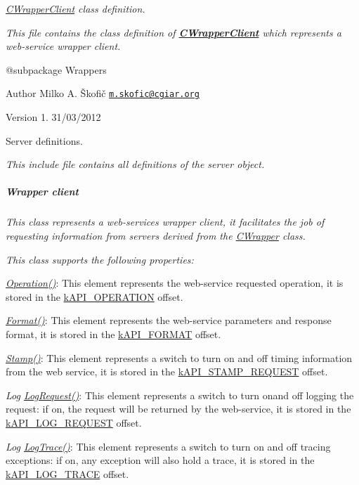 {\itshape {\itshape \hyperlink{class_c_wrapper_client}{C\-Wrapper\-Client}} class definition.}

{\itshape This file contains the class definition of {\bfseries \hyperlink{class_c_wrapper_client}{C\-Wrapper\-Client}} which represents a web-\/service wrapper client.}

{\itshape \begin{DoxyVerb} @subpackage        Wrappers
\end{DoxyVerb}
}

{\itshape \begin{DoxyAuthor}{Author}
Milko A. Škofič \href{mailto:m.skofic@cgiar.org}{\tt m.\-skofic@cgiar.\-org} 
\end{DoxyAuthor}
\begin{DoxyVersion}{Version}
1. 31/03/2012
\end{DoxyVersion}
Server definitions.}

{\itshape This include file contains all definitions of the server object. \subparagraph*{Wrapper client}}

{\itshape }

{\itshape This class represents a web-\/services wrapper client, it facilitates the job of requesting information from servers derived from the \hyperlink{class_c_wrapper}{C\-Wrapper} class.}

{\itshape This class supports the following properties\-:}

{\itshape 
\begin{DoxyItemize}
\item {\itshape \hyperlink{}{Operation()}}\-: This element represents the web-\/service requested operation, it is stored in the \hyperlink{}{k\-A\-P\-I\-\_\-\-O\-P\-E\-R\-A\-T\-I\-O\-N} offset. 
\item {\itshape \hyperlink{}{Format()}}\-: This element represents the web-\/service parameters and response format, it is stored in the \hyperlink{}{k\-A\-P\-I\-\_\-\-F\-O\-R\-M\-A\-T} offset. 
\item {\itshape \hyperlink{}{Stamp()}}\-: This element represents a switch to turn on and off timing information from the web service, it is stored in the \hyperlink{}{k\-A\-P\-I\-\_\-\-S\-T\-A\-M\-P\-\_\-\-R\-E\-Q\-U\-E\-S\-T} offset. 
\item {\itshape Log \hyperlink{}{Log\-Request()}}\-: This element represents a switch to turn onand off logging the request\-: if on, the request will be returned by the web-\/service, it is stored in the \hyperlink{}{k\-A\-P\-I\-\_\-\-L\-O\-G\-\_\-\-R\-E\-Q\-U\-E\-S\-T} offset. 
\item {\itshape Log \hyperlink{}{Log\-Trace()}}\-: This element represents a switch to turn on and off tracing exceptions\-: if on, any exception will also hold a trace, it is stored in the \hyperlink{}{k\-A\-P\-I\-\_\-\-L\-O\-G\-\_\-\-T\-R\-A\-C\-E} offset. 
\end{DoxyItemize}}

